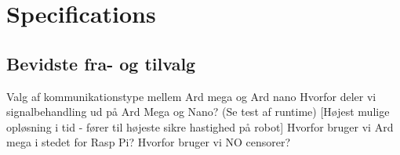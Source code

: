 \chapter{Specifications}

\section{Bevidste fra- og tilvalg}

Valg af kommunikationstype mellem Ard mega og Ard nano
Hvorfor deler vi signalbehandling ud på Ard Mega og Nano? (Se test af runtime) [Højest mulige opløsning i tid - fører til højeste sikre hastighed på robot]
Hvorfor bruger vi Ard mega i stedet for Rasp Pi?
Hvorfor bruger vi NO censorer?

